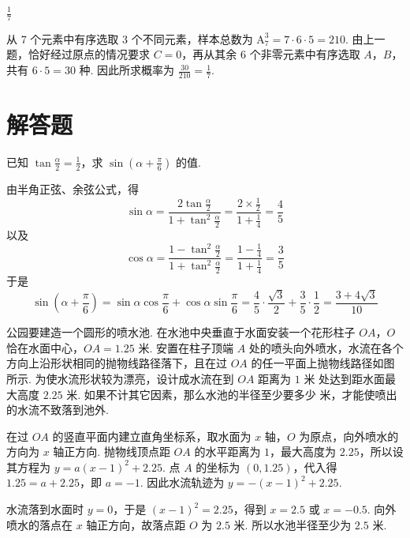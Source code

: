 \documentclass[UTF8,a4paper,oneside,11pt]{ctexbook}
\begin{document}
\begin{answer}
\(\frac{1}{7}\)
\end{answer}

\begin{solution}
从 7 个元素中有序选取 3 个不同元素，样本总数为 \(\mathrm A_7^3=7\cdot6\cdot5=210\). 由上一题，恰好经过原点的情况要求 \(C=0\)，再从其余 6 个非零元素中有序选取 \(A\)，\(B\)，共有 \(6\cdot5=30\) 种. 因此所求概率为 \(\frac{30}{210}=\frac17\).
\end{solution}

\section{解答题}

\begin{problem}
已知 \(\tan\frac{\alpha}{2}=\frac{1}{2}\)，求 \(\sin \left(\alpha +\frac{\pi}{6}\right)\) 的值.
\end{problem}

\begin{solution}
由半角正弦、余弦公式，得
\[
\sin\alpha=\frac{2\tan\frac\alpha2}{1+\tan^2\frac\alpha2}=\frac{2\times\frac12}{1+\frac14}=\frac45
\]
以及
\[
\cos\alpha=\frac{1-\tan^2\frac\alpha2}{1+\tan^2\frac\alpha2}=\frac{1-\frac14}{1+\frac14}=\frac35
\]
于是
\[
\sin\left(\alpha+\frac\pi6\right)=\sin\alpha\cos\frac\pi6+\cos\alpha\sin\frac\pi6=\frac45\cdot\frac{\sqrt3}{2}+\frac35\cdot\frac12=\frac{3+4\sqrt3}{10}
\]
\end{solution}

\begin{problem}
公园要建造一个圆形的喷水池. 在水池中央垂直于水面安装一个花形柱子 \(OA\)，\(O\) 恰在水面中心，\(OA=1.25\text{ 米}\). 安置在柱子顶端 \(A\) 处的喷头向外喷水，水流在各个方向上沿形状相同的抛物线路径落下，且在过 \(OA\) 的任一平面上抛物线路径如图所示. 为使水流形状较为漂亮，设计成水流在到 \(OA\) 距离为 \(1\text{ 米}\) 处达到距水面最大高度 \(2.25\text{ 米}\). 如果不计其它因素，那么水池的半径至少要多少\(\text{ 米}\)，才能使喷出的水流不致落到池外.

\end{problem}

\begin{solution}
在过 \(OA\) 的竖直平面内建立直角坐标系，取水面为 \(x\) 轴，\(O\) 为原点，向外喷水的方向为 \(x\) 轴正方向. 抛物线顶点距 \(OA\) 的水平距离为 \(1\)，最大高度为 \(2.25\)，所以设其方程为 \(y=a(x-1)^2+2.25\). 点 \(A\) 的坐标为 \((0,1.25)\)，代入得 \(1.25=a+2.25\)，即 \(a=-1\). 因此水流轨迹为 \(y=-(x-1)^2+2.25\).

水流落到水面时 \(y=0\)，于是 \((x-1)^2=2.25\)，得到 \(x=2.5\) 或 \(x=-0.5\). 向外喷水的落点在 \(x\) 轴正方向，故落点距 \(O\) 为 \(2.5\text{ 米}\). 所以水池半径至少为 \(2.5\text{ 米}\).
\end{solution}
\end{document}
